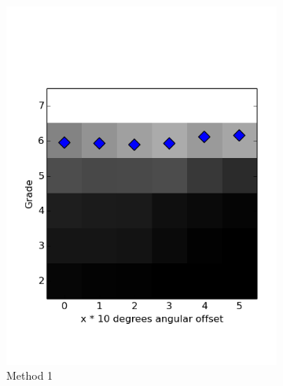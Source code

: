 \documentclass[a4paper,11pt]{report}
\begin{document}
 \begin{figure}
    \centering
    \begin{subfigure}[b]{0.45\textwidth}
        \includegraphics[width=\textwidth]{figures/grade_cumulative.png}
        \caption{Method 1}
        \label{fig:cumulative1}
    \end{subfigure}
    \begin{subfigure}[b]{0.45\textwidth}

\end{subfigure}
\end{figure}
\end{document}

